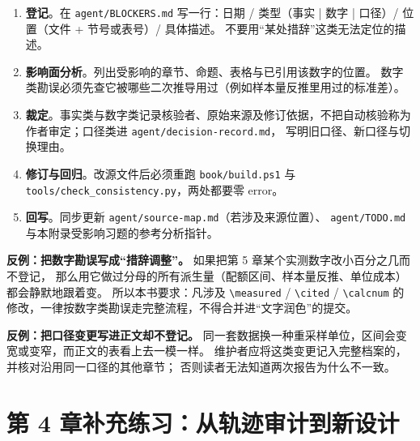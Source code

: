 \begin{enumerate}
  \item \textbf{登记}。在 \texttt{agent/BLOCKERS.md} 写一行：日期 / 类型（事实 | 数字 | 口径）/ 位置（文件 + 节号或表号）/ 具体描述。
        不要用“某处措辞”这类无法定位的描述。
  \item \textbf{影响面分析}。列出受影响的章节、命题、表格与已引用该数字的位置。
        数字类勘误必须先查它被哪些二次推导用过（例如样本量反推里用过的标准差）。
  \item \textbf{裁定}。事实类与数字类记录核验者、原始来源及修订依据，不把自动核验称为作者审定；口径类进 \texttt{agent/decision-record.md}，
        写明旧口径、新口径与切换理由。
  \item \textbf{修订与回归}。改源文件后必须重跑 \texttt{book/build.ps1} 与
        \texttt{tools/check\_consistency.py}，两处都要零 error。
  \item \textbf{回写}。同步更新 \texttt{agent/source-map.md}（若涉及来源位置）、
        \texttt{agent/TODO.md} 与本附录受影响习题的参考分析指针。
\end{enumerate}

\begin{pitfallbox}
\textbf{反例：把数字勘误写成“措辞调整”。}
如果把第 5 章某个实测数字改小百分之几而不登记，
那么用它做过分母的所有派生量（配额区间、样本量反推、单位成本）都会静默地跟着变。
所以本书要求：凡涉及 \texttt{\textbackslash measured} / \texttt{\textbackslash cited} / \texttt{\textbackslash calcnum}
的修改，一律按数字类勘误走完整流程，不得合并进“文字润色”的提交。
\end{pitfallbox}

\begin{pitfallbox}
\textbf{反例：把口径变更写进正文却不登记。}
同一套数据换一种重采样单位，区间会变宽或变窄，而正文的表看上去一模一样。
维护者应将这类变更记入完整档案的，并核对沿用同一口径的其他章节；
否则读者无法知道两次报告为什么不一致。
\end{pitfallbox}


\section{第 4 章补充练习：从轨迹审计到新设计}

